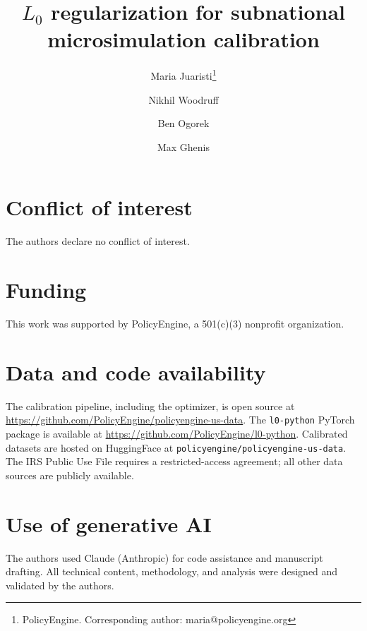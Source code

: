 \documentclass[11pt]{article}
\title{$L_0$ regularization for subnational microsimulation calibration}
\author{
    Maria Juaristi\thanks{PolicyEngine. Corresponding author: maria@policyengine.org} \and
    Nikhil Woodruff\footnotemark[1] \and
    Ben Ogorek\footnotemark[1] \and
    Max Ghenis\footnotemark[1]
}
\date{}
\begin{document}
\maketitle










\section*{Conflict of interest}
The authors declare no conflict of interest.

\section*{Funding}
This work was supported by PolicyEngine, a 501(c)(3) nonprofit organization.

\section*{Data and code availability}
The calibration pipeline, including the \lzero{} optimizer, is open source at \url{https://github.com/PolicyEngine/policyengine-us-data}. The \texttt{l0-python} PyTorch package is available at \url{https://github.com/PolicyEngine/l0-python}. Calibrated datasets are hosted on HuggingFace at \texttt{policyengine/policyengine-us-data}. The IRS Public Use File requires a restricted-access agreement; all other data sources are publicly available.

\section*{Use of generative AI}
The authors used Claude (Anthropic) for code assistance and manuscript drafting. All technical content, methodology, and analysis were designed and validated by the authors.





\end{document}
